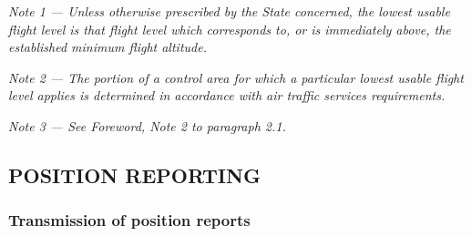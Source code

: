 \documentclass[../main.tex]{subfiles}
\begin{document}
\begin{enumerate}
        \textit{Note 1 --- Unless otherwise prescribed by the State concerned, the lowest usable flight level is that flight level which corresponds to, or is immediately above, the established minimum flight altitude.}

        \textit{Note 2 --- The portion of a control area for which a particular lowest usable flight level applies is determined in accordance with air traffic services requirements.}

        \textit{Note 3 --- See Foreword, Note 2 to paragraph 2.1.}
    \end{enumerate}

    \subsection[Position reporting]{POSITION REPORTING}

    \subsubsection{Transmission of position reports}
\end{document}
